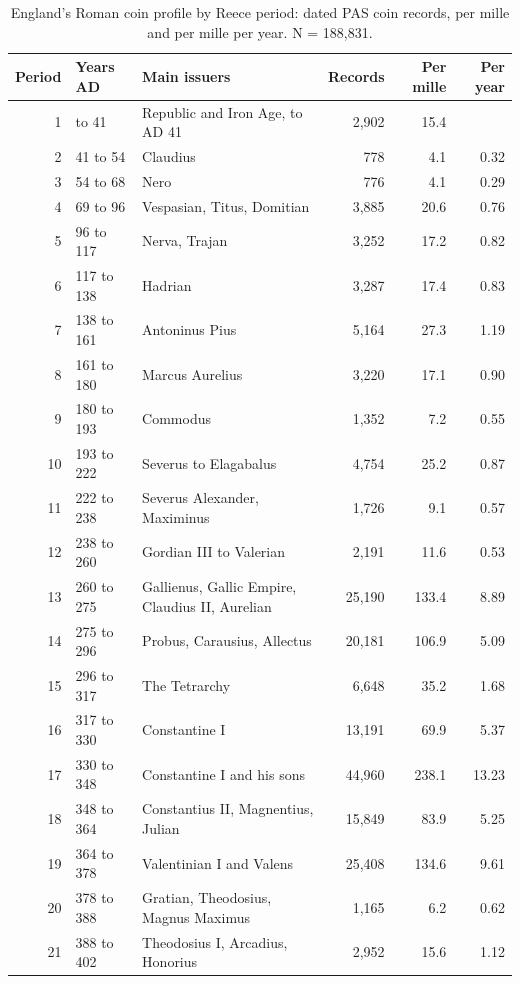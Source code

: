 \documentclass[11pt,a4paper]{article}
\begin{document}
\begin{table}[tbp]\centering\footnotesize\caption{England's Roman coin profile by Reece period: dated PAS coin records, per mille and per mille per year. N = 188,831.}\label{tab:profile}\begin{tabular}{rllrrr}\toprule Period & Years AD & Main issuers & Records & Per mille & Per year\\\midrule
1 & to 41 & Republic and Iron Age, to AD 41 & 2,902 & 15.4 & \\
2 & 41 to 54 & Claudius & 778 & 4.1 & 0.32\\
3 & 54 to 68 & Nero & 776 & 4.1 & 0.29\\
4 & 69 to 96 & Vespasian, Titus, Domitian & 3,885 & 20.6 & 0.76\\
5 & 96 to 117 & Nerva, Trajan & 3,252 & 17.2 & 0.82\\
6 & 117 to 138 & Hadrian & 3,287 & 17.4 & 0.83\\
7 & 138 to 161 & Antoninus Pius & 5,164 & 27.3 & 1.19\\
8 & 161 to 180 & Marcus Aurelius & 3,220 & 17.1 & 0.90\\
9 & 180 to 193 & Commodus & 1,352 & 7.2 & 0.55\\
10 & 193 to 222 & Severus to Elagabalus & 4,754 & 25.2 & 0.87\\
11 & 222 to 238 & Severus Alexander, Maximinus & 1,726 & 9.1 & 0.57\\
12 & 238 to 260 & Gordian III to Valerian & 2,191 & 11.6 & 0.53\\
13 & 260 to 275 & Gallienus, Gallic Empire, Claudius II, Aurelian & 25,190 & 133.4 & 8.89\\
14 & 275 to 296 & Probus, Carausius, Allectus & 20,181 & 106.9 & 5.09\\
15 & 296 to 317 & The Tetrarchy & 6,648 & 35.2 & 1.68\\
16 & 317 to 330 & Constantine I & 13,191 & 69.9 & 5.37\\
17 & 330 to 348 & Constantine I and his sons & 44,960 & 238.1 & 13.23\\
18 & 348 to 364 & Constantius II, Magnentius, Julian & 15,849 & 83.9 & 5.25\\
19 & 364 to 378 & Valentinian I and Valens & 25,408 & 134.6 & 9.61\\
20 & 378 to 388 & Gratian, Theodosius, Magnus Maximus & 1,165 & 6.2 & 0.62\\
21 & 388 to 402 & Theodosius I, Arcadius, Honorius & 2,952 & 15.6 & 1.12\\
\bottomrule\end{tabular}\end{table}
\end{document}
